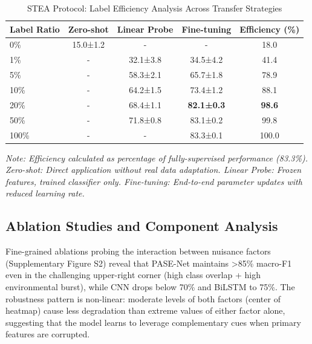 \documentclass[journal]{IEEEtran}
\begin{document}
\begin{table}[t]
\centering
\caption{STEA Protocol: Label Efficiency Analysis Across Transfer Strategies}
\label{tab:stea_results}
\small
\begin{tabular}{@{}lcccc@{}}
\toprule
\textbf{Label Ratio} & \textbf{Zero-shot} & \textbf{Linear Probe} & \textbf{Fine-tuning} & \textbf{Efficiency (\%)} \\
\midrule
0\% & 15.0±1.2 & - & - & 18.0 \\
1\% & - & 32.1±3.8 & 34.5±4.2 & 41.4 \\
5\% & - & 58.3±2.1 & 65.7±1.8 & 78.9 \\
10\% & - & 64.2±1.5 & 73.4±1.2 & 88.1 \\
20\% & - & 68.4±1.1 & \textbf{82.1±0.3} & \textbf{98.6} \\
50\% & - & 71.8±0.8 & 83.1±0.2 & 99.8 \\
100\% & - & - & 83.3±0.1 & 100.0 \\
\bottomrule
\end{tabular}
\end{table}
\textit{Note: Efficiency calculated as percentage of fully-supervised performance (83.3\%). Zero-shot: Direct application without real data adaptation. Linear Probe: Frozen features, trained classifier only. Fine-tuning: End-to-end parameter updates with reduced learning rate.}


\subsection{Ablation Studies and Component Analysis}

Fine-grained ablations probing the interaction between nuisance factors (Supplementary Figure S2) reveal that PASE-Net maintains >85\% macro-F1 even in the challenging upper-right corner (high class overlap + high environmental burst), while CNN drops below 70\% and BiLSTM to 75\%. The robustness pattern is non-linear: moderate levels of both factors (center of heatmap) cause less degradation than extreme values of either factor alone, suggesting that the model learns to leverage complementary cues when primary features are corrupted.
\end{document}
